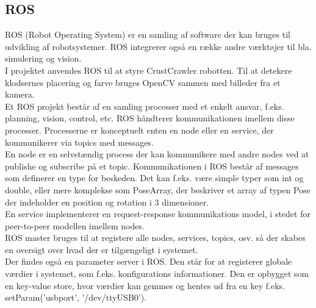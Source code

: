 \subsection{ROS}

ROS (Robot Operating System) er en samling af software der kan bruges til udvikling af robotsystemer. ROS integrerer også en række andre værktøjer til bla. simulering og vision. \\

I projektet anvendes ROS til at styre CrustCrawler robotten. Til at detekere klodsernes placering og farve bruges OpenCV sammen med billeder fra et kamera.\\

Et ROS projekt består af en samling processer med et enkelt ansvar, f.eks. planning, vision, control, etc. ROS håndterer kommunikationen imellem disse processer. Processerne er konceptuelt enten en node eller en service, der kommunikerer via topics med messages. \\

En node er en selvstændig process der kan kommunikere med andre nodes ved at publishe og subscribe på et topic. Kommunikationen i ROS består af messages som definerer en type for beskeden. Det kan f.eks. være simple typer som int og double, eller mere komplekse som PoseArray, der beskriver et array af typen Pose der indeholder en position og rotation i 3 dimensioner. \\

En service implementerer en request-response kommunikations model, i stedet for peer-to-peer modellen imellem nodes. \\

ROS master bruges til at registere alle nodes, services, topics, osv. så der skabes en oversigt over hvad der er tilgængeligt i systemet. \\

Der findes også en parameter server i ROS. Den står for at registerer globale værdier i systemet, som f.eks. konfigurations informationer. Den er opbygget som en key-value store, hvor værdier kan gemmes og hentes ud fra en key f.eks. setParam('usbport', '/dev/ttyUSB0').